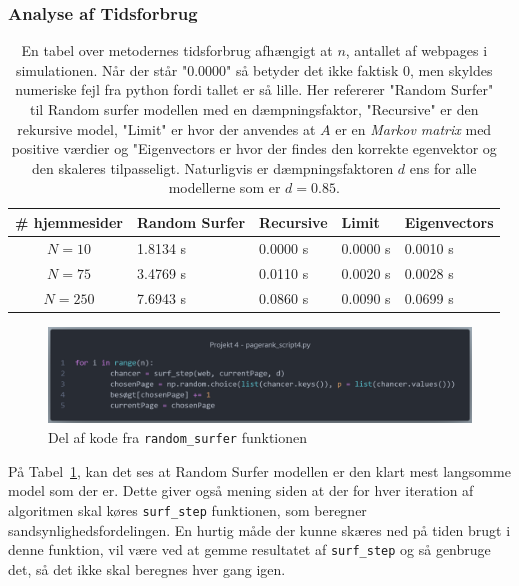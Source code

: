 \subsubsection{Analyse af Tidsforbrug}
\begin{table}[!h]
    \centering
    \begin{tabular}{c|l|l|l|l}
        \# hjemmesider & Random Surfer & Recursive & Limit & Eigenvectors \\
        \hline
        $N = 10$       & 1.8134 s   & 0.0000 s   & 0.0000 s   & 0.0010 s   \\
        $N = 75$       & 3.4769 s   & 0.0110 s   & 0.0020 s   & 0.0028 s   \\
        $N = 250$      & 7.6943 s   & 0.0860 s   & 0.0090 s   & 0.0699 s
    \end{tabular}
    \caption{En tabel over metodernes tidsforbrug afhængigt at $n$, antallet af webpages i simulationen. Når der står "0.0000" så betyder det ikke faktisk 0, men skyldes numeriske fejl fra python fordi tallet er så lille. Her refererer "Random Surfer" til Random surfer modellen med en dæmpningsfaktor, "Recursive" er den rekursive model, "Limit" er hvor der anvendes at $A$ er en \textit{Markov matrix} med positive værdier og "Eigenvectors er hvor der findes den korrekte egenvektor og den skaleres tilpasseligt. Naturligvis er dæmpningsfaktoren $d$ ens for alle modellerne som er $d = 0.85$.}
    \label{tidsFigur}
\end{table}

\begin{figure}
    \centering
    \includegraphics[width = \linewidth]{Billeder/Kode1.png}
    \caption{Del af kode fra \texttt{random\_surfer} funktionen}
\end{figure}


På Tabel~\ref{tidsFigur}, kan det ses at Random Surfer modellen er den klart mest langsomme model som der er. Dette giver også mening siden at der for hver iteration af algoritmen skal køres \texttt{surf\_step} funktionen, som beregner sandsynlighedsfordelingen. En hurtig måde der kunne skæres ned på tiden brugt i denne funktion, vil være ved at gemme resultatet af \texttt{surf\_step} og så genbruge det, så det ikke skal beregnes hver gang igen.

